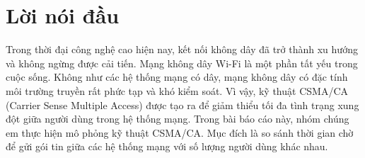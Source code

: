 %

\section*{Lời nói đầu}
\label{sec::abstract}
\parindent=10pt

Trong thời đại công nghệ cao hiện nay, kết nối không dây đã trở thành xu hướng và không ngừng được cải tiến. Mạng không dây Wi-Fi là một phần tất yếu trong cuộc sống. Không như các hệ thống mạng có dây, mạng không dây có đặc tính môi trường truyền rất phức tạp và khó kiểm soát. Vì vậy, kỹ thuật 
CSMA/CA (Carrier Sense Multiple Access) được tạo ra để giảm thiểu tối đa tình trạng xung đột giữa người dùng trong hệ thống mạng. Trong bài báo cáo này, nhóm chúng em thực hiện mô phỏng kỹ thuật CSMA/CA. Mục đích là so sánh thời gian chờ để gửi gói tin giữa các hệ thống mạng với số lượng người dùng khác nhau.





